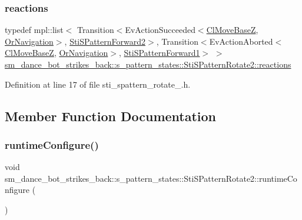 \subsubsection{\texorpdfstring{reactions}{reactions}}
{\footnotesize\ttfamily typedef mpl\+::list$<$ Transition$<$Ev\+Action\+Succeeded$<$\hyperlink{classmove__base__z__client_1_1ClMoveBaseZ}{Cl\+Move\+BaseZ}, \hyperlink{classsm__dance__bot__strikes__back_1_1OrNavigation}{Or\+Navigation}$>$, \hyperlink{structsm__dance__bot__strikes__back_1_1s__pattern__states_1_1StiSPatternForward2}{Sti\+S\+Pattern\+Forward2}$>$, Transition$<$Ev\+Action\+Aborted$<$\hyperlink{classmove__base__z__client_1_1ClMoveBaseZ}{Cl\+Move\+BaseZ}, \hyperlink{classsm__dance__bot__strikes__back_1_1OrNavigation}{Or\+Navigation}$>$, \hyperlink{structsm__dance__bot__strikes__back_1_1s__pattern__states_1_1StiSPatternForward1}{Sti\+S\+Pattern\+Forward1}$>$ $>$ \hyperlink{structsm__dance__bot__strikes__back_1_1s__pattern__states_1_1StiSPatternRotate2_a78da9524dc7c70a846265f1fae9a2336}{sm\+\_\+dance\+\_\+bot\+\_\+strikes\+\_\+back\+::s\+\_\+pattern\+\_\+states\+::\+Sti\+S\+Pattern\+Rotate2\+::reactions}}



Definition at line 17 of file sti\+\_\+spattern\+\_\+rotate\+\_.\+h.



\subsection{Member Function Documentation}
\mbox{\label{structsm__dance__bot__strikes__back_1_1s__pattern__states_1_1StiSPatternRotate2_a246c58d4d76e3250956ad024ceaed476}} 
\subsubsection{\texorpdfstring{runtime\+Configure()}{runtimeConfigure()}}
{\footnotesize\ttfamily void sm\+\_\+dance\+\_\+bot\+\_\+strikes\+\_\+back\+::s\+\_\+pattern\+\_\+states\+::\+Sti\+S\+Pattern\+Rotate2\+::runtime\+Configure (\begin{DoxyParamCaption}{ }\end{DoxyParamCaption})\hspace{0.3cm}{\ttfamily [inline]}}



